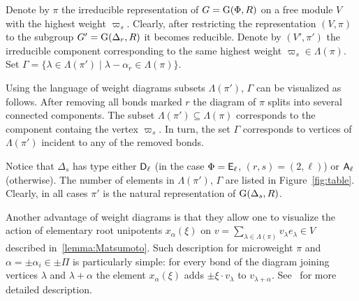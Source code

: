Denote by $\pi$ the irreducible representation of $G=\operatorname{G}(\Phi, R)$ on a free module $V$ with the highest weight $\varpi_s$.
Clearly, after restricting the representation $(V, \pi)$ to the subgroup $G'=\operatorname{G}(\Delta_r, R)$ it becomes reducible.
Denote by $(V', \pi')$ the irreducible component corresponding to the same highest weight $\varpi_s \in \Lambda(\pi)$.
Set $\Gamma = \{\lambda \in \Lambda(\pi') \mid \lambda - \alpha_r \in \Lambda(\pi) \}.$ 

Using the language of weight diagrams subsets $\Lambda(\pi')$, $\Gamma$ can be visualized as follows.
After removing all bonds marked $r$ the diagram of $\pi$ splits into several connected components.
The subset $\Lambda(\pi') \subseteq \Lambda(\pi)$ corresponds to the component containg the vertex $\varpi_s$.
In turn, the set $\Gamma$ corresponds to vertices of $\Lambda(\pi')$ incident to any of the removed bonds.

Notice that $\Delta_s$ has type either $\mathsf{D}_\ell$ (in the case $\Phi=\mathsf{E}_\ell$, $(r,s)=(2,\ell)$) or $\mathsf{A}_\ell$ (otherwise).
The number of elements in $\Lambda(\pi')$, $\Gamma$ are listed in Figure~\ref{fig:table}.
Clearly, in all cases $\pi'$ is the natural representation of $\operatorname{G}(\Delta_s, R)$.

Another advantage of weight diagrams is that they allow one to visualize the action of elementary root unipotents $x_\alpha(\xi)$ on $v = \sum_{\lambda \in \Lambda(\pi)} v_\lambda e_\lambda \in V$ described in~\cref{lemma:Matsumoto}.
Such description for microweight $\pi$ and $\alpha = \pm\alpha_i\in \pm\Pi$ is particularly simple: 
for every bond of the diagram joining vertices $\lambda$ and $\lambda + \alpha$ the element $x_{\alpha}(\xi)$ adds $\pm \xi \cdot v_\lambda$ to $v_{\lambda+\alpha}$.
See~\cite[Section~3.4]{PSV98} for more detailed description.


